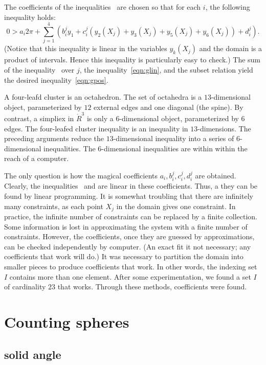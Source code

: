 The coefficients of the inequalities~
are chosen so that for each $i$, the following inequality holds:
\begin{equation}\label{eqn:glin}
0 > a_i 2\pi + \sum_{j=1}^4 (b_i^j y_1 +  c_i^j (y_2(X_j)+y_3(X_j)+y_5(X_j)+y_6(X_j)) + d_i^j).
\end{equation}
(Notice that this inequality is linear in the variables $y_k(X_j)$ and
the domain is a product of intervals.  Hence this inequality is
particularly easy to check.)  The sum of the
inequality~ over $j$, the inequality~\ref{eqn:glin},
and the subset relation yield the desired inequality~\ref{eqn:gpos}.

A four-leafd cluster is an octahedron.  The set of octahedra is a
$13$-dimensional object, parameterized by $12$ external edges and one
diagonal (the spine).  By contrast, a simpliex in $\ring{R}^3$ is only
a $6$-dimensional object, parameterized by $6$ edges.  The four-leafed
cluster inequality is an inequality in $13$-dimensions.  The preceding
arguments reduce the $13$-dimensional inequality into a series of
$6$-dimensional inequalities.  The $6$-dimensional inequalities are
within within the reach of a computer.

The only question is how the magical coefficients
$a_i,b_i^j,c_i^j,d_i^j$ are obtained.  Clearly, the
inequalities~ and  are linear in these
coefficients.  Thus, a they can be found by linear programming.  It is
somewhat troubling that there are infinitely many constraints, as each
point $X_j$ in the domain gives one constraint.  In practice, the
infinite number of constraints can be replaced by a finite collection.
Some information is lost in approximating the system with a finite
number of constraints.  However, the coefficients, once they are
guessed by approximations, can be checked independently by computer.
(An exact fit it not necessary; any coefficients that work will do.)
It was necessary to partition the domain into smaller pieces to
produce coefficients that work.  In other words, the indexing set $I$
contains more than one element.  After some experimentation, we found
a set $I$ of cardinality $23$ that works.  Through these methods,
coefficients were found.


\section{Counting spheres}


\subsection{solid angle}
%
%


